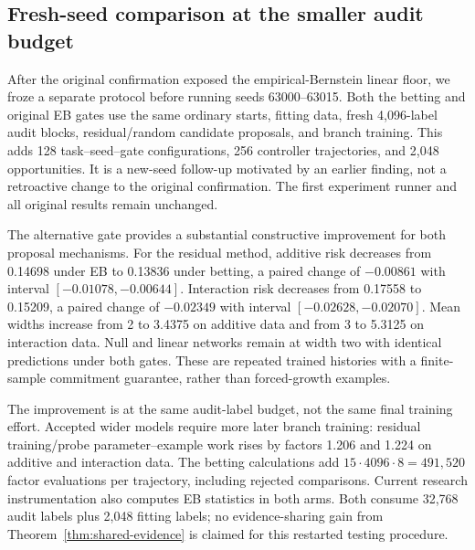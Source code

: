 \subsection{Fresh-seed comparison at the smaller audit budget}
After the original confirmation exposed the empirical-Bernstein linear floor,
we froze a separate protocol before running seeds 63000--63015. Both the
betting and original EB gates use the same ordinary starts, fitting data,
fresh 4,096-label audit blocks, residual/random candidate proposals, and
branch training. This adds 128 task--seed--gate configurations, 256 controller
trajectories, and 2,048 opportunities. It is a new-seed follow-up motivated by
an earlier finding, not a retroactive change to the original confirmation.
The first experiment runner and all original results remain unchanged.

\begin{table}[tb]
\centering\scriptsize
\resizebox{\linewidth}{!}{}
\caption{New-seed gate comparison, 16 paired repetitions per task and proposal.
Both gates use 4,096 fresh audit labels per opportunity. Paired difference is
betting minus EB Brier risk, with a descriptive 95\% Student-$t$ interval.
Width is the mean final hidden-unit count. The betting gate's extra products
are not included in training parameter--example matching.}
\label{tab:betting}
\end{table}

The alternative gate provides a substantial constructive improvement for
both proposal mechanisms. For the residual method, additive risk decreases
from 0.14698 under EB to 0.13836 under betting, a paired change of
$-0.00861$ with interval $[-0.01078,-0.00644]$. Interaction risk decreases
from 0.17558 to 0.15209, a paired change of $-0.02349$ with interval
$[-0.02628,-0.02070]$. Mean widths increase from 2 to 3.4375 on additive
data and from 3 to 5.3125 on interaction data. Null and linear networks
remain at width two with identical predictions under both gates.
These are repeated trained histories with a finite-sample commitment
guarantee, rather than forced-growth examples.

The improvement is at the same audit-label budget, not the same final
training effort. Accepted wider models require more later branch training:
residual training/probe parameter--example work rises by factors 1.206 and
1.224 on additive and interaction data. The betting calculations add
$15\cdot4096\cdot8=491{,}520$ factor evaluations per trajectory, including
rejected comparisons. Current research instrumentation also computes EB
statistics in both arms. Both consume 32,768 audit labels plus 2,048 fitting
labels; no evidence-sharing gain from Theorem~\ref{thm:shared-evidence} is
claimed for this restarted testing procedure.

